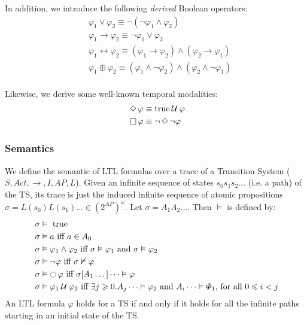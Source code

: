 \documentclass{article}
\begin{document}
In addition, we introduce the following \emph{derived} Boolean operators: 
\begin{align*}
    &\; \varphi_1 \lor \varphi_2 \equiv \neg (\neg \varphi_1 \land \varphi_2) \\
    &\; \varphi_1 \rightarrow \varphi_2 \equiv \neg \varphi_1 \lor \varphi_2 \\
    &\; \varphi_1 \leftrightarrow  \varphi_2 \equiv (\varphi_1 \rightarrow \varphi_2) \land (\varphi_2 \rightarrow \varphi_1) \\
    &\; \varphi_1 \oplus  \varphi_2 \equiv (\varphi_1 \land \neg \varphi_2) \land (\varphi_2 \land \neg \varphi_1)\\
\end{align*}

Likewise, we derive some well-known temporal modalities:
\begin{align*}
    &\; \mathop{\Diamond} \varphi \equiv \text{true} \mathbin{\mathcal{U}} \varphi \\
    &\; \mathop{\square} \varphi \equiv \neg \mathop{\Diamond} \neg \varphi \\
\end{align*}

\subsubsection*{Semantics}
We define the semantic of LTL formulas over a trace of a Transition System ($S, Act, \rightarrow, I, AP, L$). 
Given an infinite sequence of states $s_0s_1s_2 \dots$ (i.e. a path) of the TS, 
its trace is just the induced infinite sequence of atomic propositions $ \sigma = L(s_0)L(s_1) \dots \in (2^{AP})^{\omega}$.
Let $\sigma = A_1A_2 \dots$. Then $\vDash$ is defined by: 
\begin{align*}
    &\; \sigma \vDash \text{ true} \\
    &\; \sigma \vDash a \text{ iff } a \in A_0 \\
    &\; \sigma \vDash \varphi_1 \land \varphi_2 \text{ iff } \sigma \vDash \varphi_1 \text{ and } \sigma \vDash \varphi_2 \\
    &\; \sigma \vDash \neg \varphi \text{ iff } \sigma \nvDash \varphi \\
    &\; \sigma \vDash \mathop{\ocircle}{\varphi} \text{ iff } \sigma [A_1 \dots] \dots \vDash \varphi \\
    &\; \sigma \vDash \varphi_1 \mathbin{\mathcal{U}} \varphi_2 \text{ iff } \exists j \geqslant 0 .  A_j \dots \vDash \varphi_2 \text{ and } A_i \dots \vDash \varPhi_1 \text{, for all } 0 \leqslant  i < j
\end{align*}
An LTL formula $\varphi$ holds for a TS if and only if it holds for all the infinite paths 
starting in an initial state of the TS.
\end{document}
